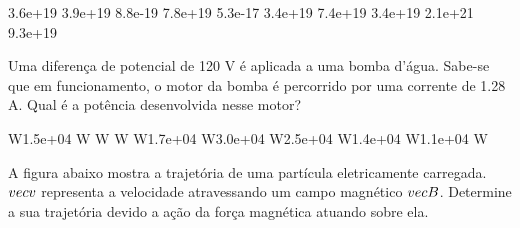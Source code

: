 \documentclass[12pt, addpoints]{exam}
\begin{document}
\begin{questions}
\begin{multicols*}{2}
\begin{oneparchoices}
\choice 3.6e+19 \choice 3.9e+19 \choice 8.8e-19 \choice 7.8e+19 \choice 5.3e-17 \choice 3.4e+19 \choice 7.4e+19 \choice 3.4e+19 \choice 2.1e+21 \choice 9.3e+19 
\end{oneparchoices}\question Uma diferença de potencial de 120 V é aplicada a uma bomba d’água. Sabe-se que em funcionamento, o motor da bomba é percorrido por uma corrente de    1.28 A. Qual é a potência desenvolvida nesse motor?

\begin{oneparchoices}
 W\choice 1.5e+04 W W W W\choice 1.7e+04 W\choice 3.0e+04 W\choice 2.5e+04 W\choice 1.4e+04 W\choice 1.1e+04 W
\end{oneparchoices}\question A ﬁgura abaixo mostra a trajetória de uma partícula eletricamente carregada. $\\vec{{v}}$ representa a velocidade atravessando um campo magnético $\\vec{{B}}$. Determine a sua trajetória devido a ação da força magnética atuando sobre ela.
        
        \begin{center}
            \begin{minipage}[c]{0.5\linewidth}
            \end{minipage}
        \end{center}


\end{multicols*}
\end{questions}
\end{document}
